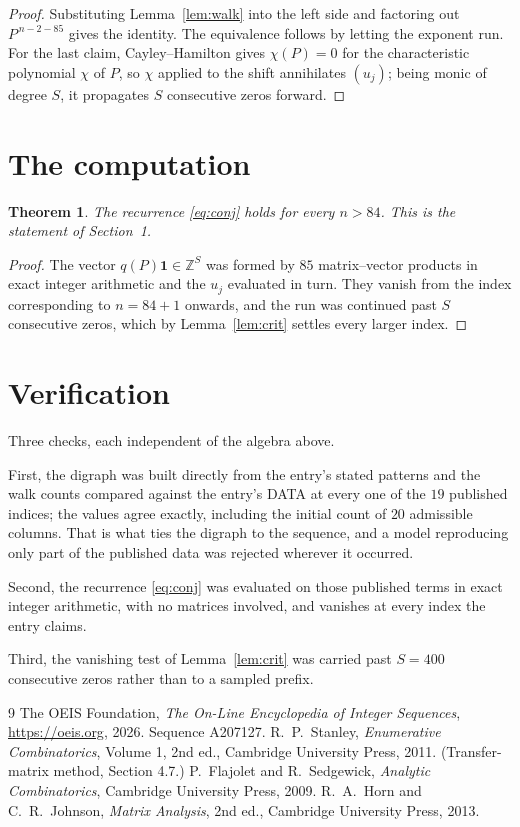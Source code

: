 \documentclass[11pt,a4paper]{article}
\theoremstyle{plain}
\newtheorem{theorem}{Theorem}
\theoremstyle{definition}
\begin{document}
\begin{proof}
Substituting Lemma~\ref{lem:walk} into the left side and factoring out
$P^{\,n-2-85}$ gives the identity. The equivalence follows by letting the exponent
run. For the last claim, Cayley--Hamilton gives $\chi(P)=0$ for the characteristic
polynomial $\chi$ of $P$, so $\chi$ applied to the shift annihilates $(u_j)$; being monic of
degree $S$, it propagates $S$ consecutive zeros forward.
\end{proof}

\section{The computation}

\begin{theorem}
The recurrence \eqref{eq:conj} holds for every $n>84$. This is the statement of
Section~1.
\end{theorem}

\begin{proof}
The vector $q(P)\mathbf{1}\in\mathbb{Z}^{S}$ was formed by $85$ matrix--vector
products in exact integer arithmetic and the $u_j$ evaluated in turn. They vanish from the
index corresponding to $n=84+1$ onwards, and the run was continued past $S$ consecutive
zeros, which by Lemma~\ref{lem:crit} settles every larger index.
\end{proof}

\section{Verification}

Three checks, each independent of the algebra above.

First, the digraph was built directly from the entry's stated patterns and the walk counts
compared against the entry's DATA at every one of the $19$ published indices; the
values agree exactly, including the initial count of $20$ admissible columns. That is
what ties the digraph to the sequence, and a model reproducing only part of the published
data was rejected wherever it occurred.

Second, the recurrence \eqref{eq:conj} was evaluated on those published terms in exact
integer arithmetic, with no matrices involved, and vanishes at every index the entry claims.

Third, the vanishing test of Lemma~\ref{lem:crit} was carried past $S=400$ consecutive
zeros rather than to a sampled prefix.

\begin{thebibliography}{9}
 The OEIS Foundation, \emph{The On-Line Encyclopedia of Integer
Sequences}, \url{https://oeis.org}, 2026. Sequence A207127.
 R.~P.~Stanley, \emph{Enumerative Combinatorics}, Volume 1, 2nd ed.,
Cambridge University Press, 2011. (Transfer-matrix method, Section 4.7.)
 P.~Flajolet and R.~Sedgewick, \emph{Analytic Combinatorics}, Cambridge
University Press, 2009.
 R.~A.~Horn and C.~R.~Johnson, \emph{Matrix Analysis}, 2nd ed., Cambridge
University Press, 2013.
\end{thebibliography}
\end{document}
